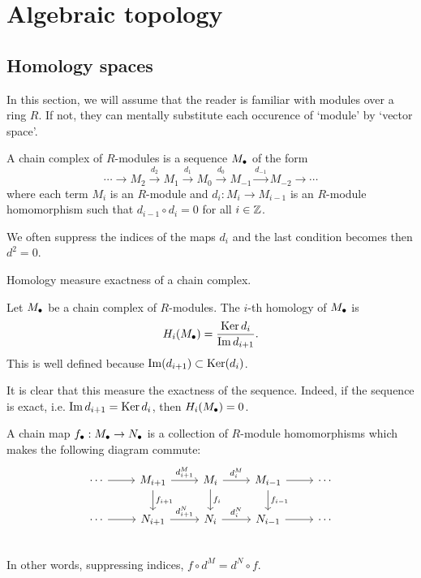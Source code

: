 \section*{Algebraic topology}
\subsection*{Homology spaces}
In this section, we will assume that the reader is familiar with modules over a ring $R$. If not, they can mentally substitute each occurence of `module' by `vector space'.

\begin{definition}
    A chain complex of $R$-modules is a sequence $M_\bullet$ of the form
    \[
    \cdots \to  M_2 \xrightarrow{d_2}  M_1 \xrightarrow{d_1} M_0 \xrightarrow{d_0} M_{-1} \xrightarrow{d_{-1}}   M_{-2} \to  \cdots
    \] 
    where each term $M_i$ is an $R$-module and $d_i: M_i \to  M_{i-1}$ is an $R$-module homomorphism such that $d_{i-1}  \circ  d_i = 0$  for all $i \in \mathbb{Z}$.
\end{definition}
We often suppress the indices of the maps $d_i$ and the last condition becomes then  $d^2 = 0$.

\begin{marginfigure}
    \centering
    \caption{Homology measure exactness of a chain complex.}
    \label{fig:homology-definition}
\end{marginfigure}

\begin{definition}[Homology]
    Let $M_\bullet$ be a chain complex of  $R$-modules. The $i$-th homology of $M_\bullet$ is
     \[
         H_i(M_\bullet) = \frac{\operatorname{Ker} d_i}{\operatorname{Im} d_{i+1}}
    .\] 
    This is well defined because $\operatorname{Im}(d_{i+1}) \subset \operatorname{Ker} (d_i)$.
\end{definition}
It is clear that this measure the exactness of the sequence. Indeed, if the sequence is exact, i.e. $\operatorname{Im} d_{i+1} = \operatorname{Ker} d_i$, then $H_i(M_\bullet) = 0$.


\begin{definition}
    A chain map $f_\bullet: M_\bullet \to  N_\bullet$ is a collection of $R$-module homomorphisms which makes the following diagram commute:
    \[
        \begin{tikzcd}
            \cdots  \arrow[r, ""]&
            M_{i+1} \arrow[r, "d_{i+1}^{M}"] \arrow[d, "f_{i+1}"]&
            M_{i} \arrow[r, "d_{i}^{M}"] \arrow[d, "f_i"]&
            M_{i-1} \arrow[r, ""] \arrow[d, "f_{i-1}"]&
            \cdots \\
            \cdots  \arrow[r, ""]&
            N_{i+1} \arrow[r, "d_{i+1}^{N}"] &
            N_{i} \arrow[r, "d_{i}^{N}"] &
            N_{i-1} \arrow[r, ""] &
            \cdots \\
        \end{tikzcd}
    \]
    In other words, suppressing indices, $f  \circ  d^{M} = d^{N}  \circ f$.
\end{definition}

